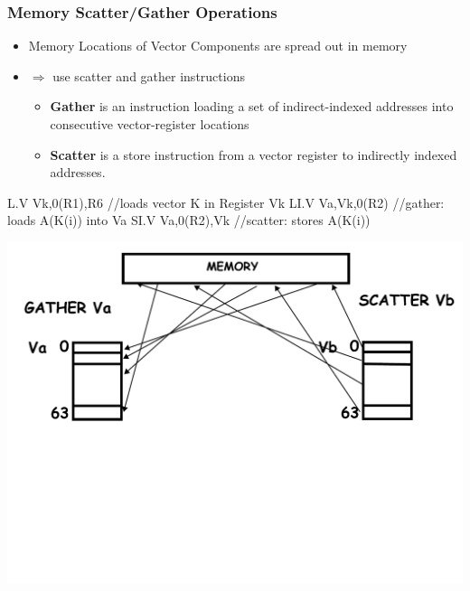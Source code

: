 \documentclass{beamer}
\newcommand{\emp}[1]{\textcolor{DikuRed}{ #1}}
\begin{document}
\begin{frame}[fragile,t]
\frametitle{Memory Scatter/Gather Operations}

\begin{itemize}
    \item Memory Locations of Vector Components are spread out in memory
    \item $\Rightarrow$ use scatter and gather instructions\medskip 
        \begin{itemize}
            \item \emp{\bf Gather} is an instruction loading a set of
                    indirect-indexed addresses into consecutive 
                    vector-register locations\smallskip
            \item \emp{\bf Scatter} is a store instruction from a vector
                    register to indirectly indexed addresses.
        \end  {itemize}
\end  {itemize}

\begin{colorcode}[fontsize=\scriptsize]
L.V   Vk,0(R1),R6  //loads vector K in Register Vk
LI.V  Va,Vk,0(R2)  //gather: loads A(K(i)) into Va
SI.V  Va,0(R2),Vk  //scatter: stores A(K(i))
\end{colorcode}


\includegraphics[width=49ex]{Figures/VectScatterGather}

\end{frame}
\end{document}
